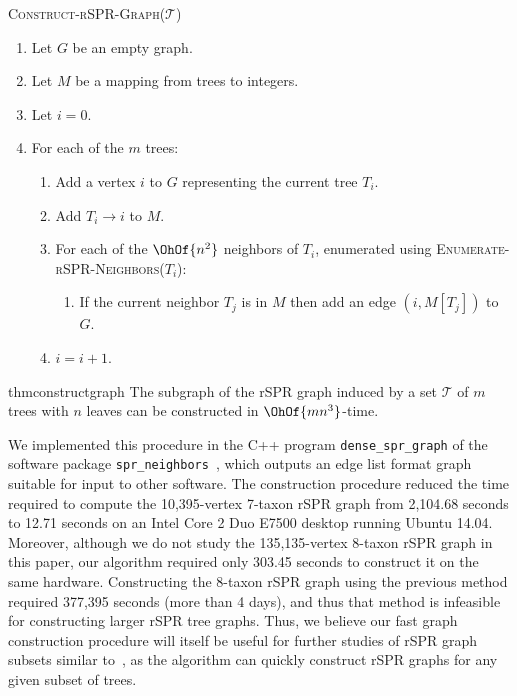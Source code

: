 \documentclass[10pt,twoside,leqno,twocolumn]{article}
\newtheorem{thm}{Theorem}[section]
\begin{document}
\vspace{1em}
\textsc{Construct-rSPR-Graph($\mathcal{T}$)}
\begin{enumerate}[label={\arabic*}.]
	\item Let $G$ be an empty graph.
	\item Let $M$ be a mapping from trees to integers.
	\item Let $i = 0$.
	\item For each of the $m$ trees: \vspace{-0.2em}
		\begin{enumerate}
			\item Add a vertex $i$ to $G$ representing the current tree $T_i$.
			\item Add $T_i \rightarrow i$ to $M$.
			\item For each of the $\OhOf{n^2}$ neighbors of $T_i$, enumerated using \textsc{Enumerate-rSPR-Neighbors($T_i$)}:
				\begin{enumerate}
					\item If the current neighbor $T_j$ is in $M$ then add an edge $(i,M[T_j])$ to $G$.
				\end{enumerate}
		\item $i = i + 1$.
		\end{enumerate}
\end{enumerate}

\begin{restatable}{thm}{constructgraph}
	\label{thm:construct_graph}
	The subgraph of the rSPR graph induced by a set $\mathcal{T}$ of $m$ trees with $n$ leaves can be constructed in $\OhOf{mn^3}$-time.
\end{restatable}

We implemented this procedure in the C++ program \texttt{dense\_spr\_graph} of the software package \texttt{spr\_neighbors}~\cite{spr_neighbors}, which outputs an edge list format graph suitable for input to other software.
The construction procedure reduced the time required to compute the 10,395-vertex 7-taxon rSPR graph from 2,104.68 seconds to 12.71 seconds on an Intel Core 2 Duo E7500 desktop running Ubuntu 14.04.
Moreover, although we do not study the 135,135-vertex 8-taxon rSPR graph in this paper, our algorithm required only 303.45 seconds to construct it on the same hardware.
Constructing the 8-taxon rSPR graph using the previous method required 377,395 seconds (more than 4 days), and thus that method is infeasible for constructing larger rSPR tree graphs.
Thus, we believe our fast graph construction procedure will itself be useful for further studies of rSPR graph subsets similar to~\cite{Whidden2015-yi}, as the algorithm can quickly construct rSPR graphs for any given subset of trees.
\end{document}
